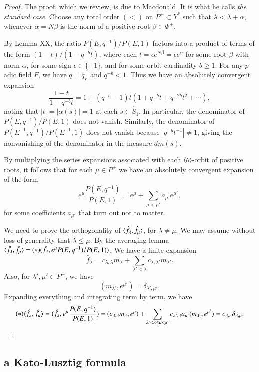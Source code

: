 \begin{proof}  
The proof, which we review, is due to Macdonald.
It is what he calls {\it the standard case}.  
Choose any total order $(<)$ on $P^+\subset Y^*$ such that 
$\lambda < \lambda + \alpha$, whenever $\alpha = N\beta$ is the norm of a positive root $\beta\in\Phi^+$.

By Lemma XX,
the ratio $P(E,q^{-1})/P(E,1)$  factors into a product of terms of the form $(1- t)/(1- q^{-b} t)$, 
where each $t = \epsilon e^{N\beta} = \epsilon e^\alpha$ for
some root $\beta$ with norm $\alpha$, 
for some sign $\epsilon\in \{\pm 1\}$, and for some orbit cardinality $b\ge 1$.
For any $p$-adic field $F$, we have $q = q_F$ and $q^{-b} < 1$.  Thus we have an absolutely convergent 
expansion
\[
\frac{1- t}{1- q^{-b} t} = 1 + (q^{-b}-1) t (1+ q^{-b} t + q^{-2b} t^2 + \cdots),
\]
noting that $|t| = |\alpha(s)|=1$ at each $s\in \hat S_1$.  In particular, the denominator of $P(E,q^{-1})/P(E,1)$ does not
vanish.  Similarly, the
denominator of $P(E^{-1},q^{-1})/P(E^{-1},1)$ does not vanish because $|q^{-b} t^{-1}|\ne1$, giving the nonvanishing of the
denominator in the measure $dm(s)$.

By multiplying the series expansions associated with each $\langle{\theta}\rangle$-orbit of positive roots,
it follows that for each $\mu\in P^+$ we have an absolutely convergent expansion of the form
\[
e^\mu \frac{P(E,q^{-1})}{P(E,1)} = e^\mu +\sum_{\mu< \mu'} a_{\mu'} e^{\mu'},
\] 
for some coefficients $a_{\mu'}$ that turn out not to matter.

We need to prove the orthogonality of $\langle{\hat f_\lambda,\hat f_\mu}\rangle$, for $\lambda\ne\mu$.  
We may assume without loss of generality that $\lambda \le \mu$.
By the averaging lemma $\langle{\hat f_\lambda,\hat f_\mu}\rangle = (*) (\hat f_\lambda,e^\mu P(E,q^{-1})/P(E,1))$.
We have a finite expansion
\[
\hat f_\lambda = c_{\lambda,\lambda} m_\lambda + \sum_{\lambda' <\lambda } c_{\lambda,\lambda'} m_{\lambda'}.
\]
Also, for $\lambda',\mu'\in P^+$, we have
\[
(m_{\lambda'},e^{\mu'}) = \delta_{\lambda',{\mu'}}.
\]
Expanding everything and integrating term by term, we have
\[
(*)\langle{\hat f_\lambda,\hat f_\mu}\rangle = (\hat f_\lambda, e^\mu \frac{ P(E,q^{-1})}{P(E,1)}) = (c_{\lambda,\lambda} m_\lambda,e^\mu) + \sum_{\lambda' < \lambda\le\mu < \mu'}
c_{\lambda',\lambda} a_{\mu'} (m_{\lambda'},e^{\mu'}) = c_{\lambda,\lambda} \delta_{\lambda,\mu}.
\]
\end{proof}



\subsection{a Kato-Lusztig formula}

